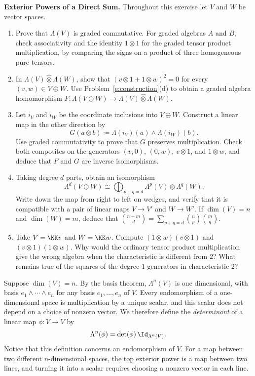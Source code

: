 \documentclass[12pt,reqno]{amsart}
\begin{document}
\begin{problems}
\item\label{e:directsum} \textbf{Exterior Powers of a Direct Sum.} Throughout this exercise let $V$ and $W$ be vector spaces.
\begin{enumerate}
\item Prove that $\Lambda(V)$ is graded commutative. For graded algebras $A$ and $B$, check associativity and the identity $1\otimes1$ for the graded tensor product multiplication, by comparing the signs on a product of three homogeneous pure tensors.
\item In $\Lambda(V)\mathbin{\widehat\otimes}\Lambda(W)$, show that $(v\otimes1+1\otimes w)^2=0$ for every $(v,w)\in V\oplus W$. Use Problem~\ref{e:construction}(d) to obtain a graded algebra homomorphism $F:\Lambda(V\oplus W)\to\Lambda(V)\mathbin{\widehat\otimes}\Lambda(W)$.
\item Let $i_V$ and $i_W$ be the coordinate inclusions into $V\oplus W$. Construct a linear map in the other direction by
\[
G(a\otimes b)\coloneqq\Lambda(i_V)(a)\wedge\Lambda(i_W)(b).
\]
Use graded commutativity to prove that $G$ preserves multiplication. Check both composites on the generators $(v,0)$, $(0,w)$, $v\otimes1$, and $1\otimes w$, and deduce that $F$ and $G$ are inverse isomorphisms.
\item Taking degree $d$ parts, obtain an isomorphism
\[
\Lambda^d(V\oplus W)\cong\bigoplus_{p+q=d}\Lambda^p(V)\otimes\Lambda^q(W).
\]
Write down the map from right to left on wedges, and verify that it is compatible with a pair of linear maps $V\to V'$ and $W\to W'$. If $\dim(V)=n$ and $\dim(W)=m$, deduce that $\binom{n+m}{d}=\sum_{p+q=d}\binom{n}{p}\binom{m}{q}$.
\item Take $V=\KK v$ and $W=\KK w$. Compute $(1\otimes w)(v\otimes1)$ and $(v\otimes1)(1\otimes w)$. Why would the ordinary tensor product multiplication give the wrong algebra when the characteristic is different from $2$? What remains true of the squares of the degree $1$ generators in characteristic $2$?
\end{enumerate}
\end{problems}

\hrulefill

Suppose $\dim(V)=n$. By the basis theorem, $\Lambda^n(V)$ is one dimensional, with basis $e_1\wedge\cdots\wedge e_n$ for any basis $e_1,\ldots,e_n$ of $V$. Every endomorphism of a one-dimensional space is multiplication by a unique scalar, and this scalar does not depend on a choice of nonzero vector. We therefore define the \emph{determinant} of a linear map $\phi:V\to V$ by
\[
\Lambda^n(\phi)=\det(\phi)\,\Id_{\Lambda^n(V)}.
\]
Notice that this definition concerns an endomorphism of $V$. For a map between two different $n$-dimensional spaces, the top exterior power is a map between two lines, and turning it into a scalar requires choosing a nonzero vector in each line.
\end{document}
